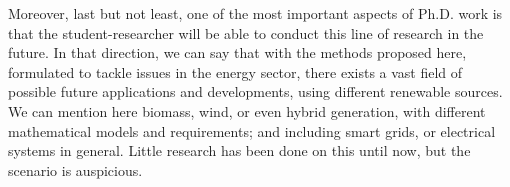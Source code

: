 Moreover, last but not least, one of the most important aspects of Ph.D. work is that the student-researcher will be able to conduct this line of research in the future. In that direction, we can say that with the methods proposed here,  formulated to tackle issues in the energy sector, there exists a vast field of possible future applications and developments, using different renewable sources. We can mention here biomass, wind, or even hybrid generation, with different mathematical models and requirements; and including smart grids, or electrical systems in general. Little research has been done on this until now, but the scenario is auspicious.
%
